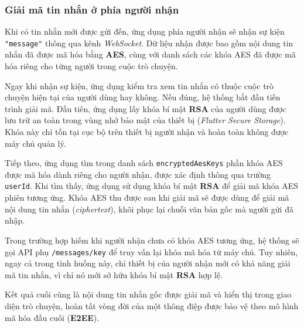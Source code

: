 \subsubsection{Giải mã tin nhắn ở phía người nhận}
\indent Khi có tin nhắn mới được gửi đến, ứng dụng phía người nhận sẽ nhận sự kiện \texttt{"message"} thông qua kênh \textit{WebSocket}.  
Dữ liệu nhận được bao gồm nội dung tin nhắn đã được mã hóa bằng \textbf{AES}, cùng với danh sách các khóa AES đã được mã hóa riêng cho từng người trong cuộc trò chuyện.

\indent Ngay khi nhận sự kiện, ứng dụng kiểm tra xem tin nhắn có thuộc cuộc trò chuyện hiện tại của người dùng hay không.  
Nếu đúng, hệ thống bắt đầu tiến trình giải mã. Đầu tiên, ứng dụng lấy khóa bí mật \textbf{RSA} của người dùng được lưu trữ an toàn trong vùng nhớ bảo mật của thiết bị (\textit{Flutter Secure Storage}).  
Khóa này chỉ tồn tại cục bộ trên thiết bị người nhận và hoàn toàn không được máy chủ quản lý.

\indent Tiếp theo, ứng dụng tìm trong danh sách \texttt{encryptedAesKeys} phần khóa AES được mã hóa dành riêng cho người nhận, được xác định thông qua trường \texttt{userId}.  
Khi tìm thấy, ứng dụng sử dụng khóa bí mật \textbf{RSA} để giải mã khóa AES phiên tương ứng.  
Khóa AES thu được sau khi giải mã sẽ được dùng để giải mã nội dung tin nhắn (\textit{ciphertext}), khôi phục lại chuỗi văn bản gốc mà người gửi đã nhập.

\indent Trong trường hợp hiếm khi người nhận chưa có khóa AES tương ứng, hệ thống sẽ gọi API phụ \texttt{/messages/key} để truy vấn lại khóa mã hóa từ máy chủ.  
Tuy nhiên, ngay cả trong tình huống này, chỉ thiết bị của người nhận mới có khả năng giải mã tin nhắn, vì chỉ nó mới sở hữu khóa bí mật \textbf{RSA} hợp lệ.

\indent Kết quả cuối cùng là nội dung tin nhắn gốc được giải mã và hiển thị trong giao diện trò chuyện, hoàn tất vòng đời của một thông điệp được bảo vệ theo mô hình mã hóa đầu cuối (\textbf{E2EE}).
